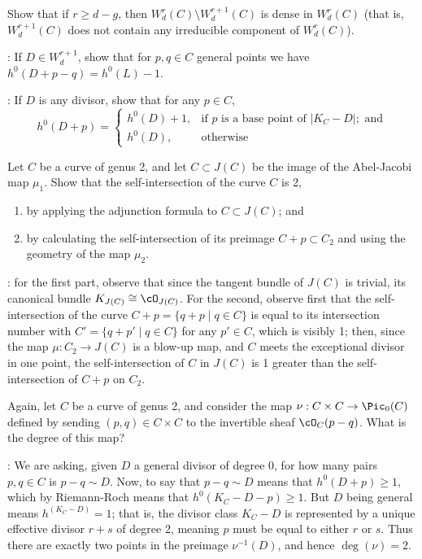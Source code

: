 \begin{exercise}
Show that if $r \geq d-g$, then $W^r_d(C) \setminus W^{r+1}_d(C)$ is dense in $W^r_d(C)$ (that is, $W^{r+1}_d(C)$ does not contain any irreducible component of $W^r_d(C)$).

: If $D \in W^{r+1}_d$, show that for $p, q \in C$ general points we have $h^0(D+p-q) = h^0(L) - 1$.

:  If $D$ is any divisor, show that for any $p \in C$,
$$
h^0(D+p) = 
\begin{cases}
h^0(D) + 1, &\text{if $p$ is a base point of } |K_C-D|; \text{ and} \\
h^0(D), &\text{otherwise}
\end{cases}
$$

\end{exercise}

\begin{exercise}
Let $C$ be a curve of genus 2, and let $C \subset J(C)$ be the image of the Abel-Jacobi map $\mu_1$. Show that the self-intersection of the curve $C$ is 2,
\begin{enumerate}
\item by applying the adjunction formula to $C \subset J(C)$; and
\item by calculating the self-intersection of its preimage $C + p \subset C_2$ and using the geometry of the map $\mu_2$.
\end{enumerate}

:  for the first part, observe that since the tangent bundle of $J(C)$ is trivial, its canonical bundle $K_{J(C)} \cong \cO_{J(C)}$. For the second, observe first that the self-intersection of the curve $C+p = \{q+p \mid q \in C\}$ is equal to its intersection number with $C' = \{q+p' \mid q \in C\}$ for any $p' \in C$, which is visibly 1; then, since the map $\mu : C_2 \to J(C)$ is a blow-up map, and $C$ meets the exceptional divisor in one point, the self-intersection of $C$ in $J(C)$ is 1 greater than the self-intersection of $C+p$ on $C_2$.
\end{exercise}

\begin{exercise}
Again, let $C$ be a curve of genus 2, and consider the map $\nu : C \times C \to \Pic_0(C)$ defined by sending $(p, q)\in C \times C$ to the invertible sheaf $\cO_C(p-q)$. What is the degree of this map?

: We are asking, given $D$ a general divisor  of degree 0, for how many pairs $p, q \in C$ is $p-q \sim D$. Now, to say that   $p-q \sim D$ means that $h^0(D+p) \geq 1$, which by Riemann-Roch means that $h^0(K_C-D-p) \geq 1$. But $D$ being general means $h^(K_C - D) = 1$; that is, the divisor class $K_C - D$ is represented by a unique effective divisor $r+s$ of degree 2, meaning $p$ must be equal to either $r$ or $s$. Thus there are exactly two points in the preimage $\nu^{-1}(D)$, and hence $\deg(\nu) = 2$.
\end{exercise}

